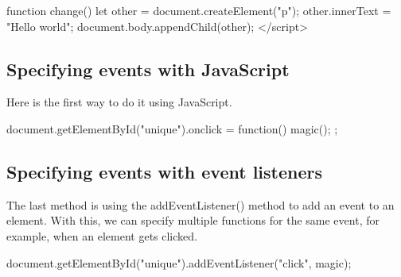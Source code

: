 \documentclass{report}
\begin{document}
\begin{jscode}
\begin{jscode}
        function change() {
            let other = document.createElement("p");
            other.innerText = "Hello world";
            document.body.appendChild(other);
        }
    </script>
\end{jscode}


\pagebreak 
{}
\bigbreak \noindent 
\subsection{Specifying events with JavaScript}
\bigbreak \noindent 
Here is the first way to do it using JavaScript.
\bigbreak \noindent 
\begin{jscode}
document.getElementById("unique").onclick = function() { magic(); };
\end{jscode}

\bigbreak \noindent 
\subsection{Specifying events with event listeners}
\bigbreak \noindent 
The last method is using the addEventListener() method to add an event to an
element. With this, we can specify multiple functions for the same event, for
example, when an element gets clicked.
\bigbreak \noindent 
\begin{jscode}
document.getElementById("unique").addEventListener("click", magic);
\end{jscode}

\bigbreak \noindent 

\end{jscode}
\end{document}
